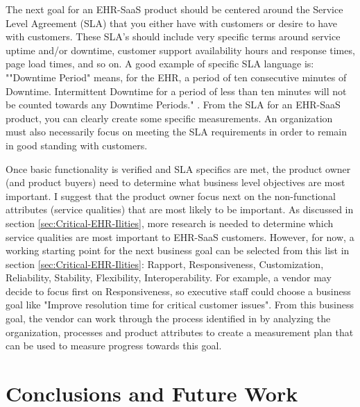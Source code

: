 \documentclass[10pt]{article}
\begin{document}
The next goal for an EHR-SaaS product should be centered around the Service Level Agreement (SLA) that you either have with customers or desire to have with customers.
These SLA's should include very specific terms around service uptime and/or downtime, customer support availability hours and response times, page load times, and so on.
A good example of specific SLA language is: ""Downtime Period" means, for the EHR, a period of ten consecutive minutes of Downtime. Intermittent Downtime for a period of less than ten minutes will not be counted towards any Downtime Periods." \cite{emr-sla-example}. 
From the SLA for an EHR-SaaS product, you can clearly create some specific measurements.
An organization must also necessarily focus on meeting the SLA requirements in order to remain in good standing with customers.

Once basic functionality is verified and SLA specifics are met, the product owner (and product buyers) need to determine what business level objectives are most important.
I suggest that the product owner focus next on the non-functional attributes (service qualities) that are most likely to be important.
As discussed in section \ref{sec:Critical-EHR-Ilities}, more research is needed to determine which service qualities are most important to EHR-SaaS customers.
However, for now, a working starting point for the next business goal can be selected from this list in section \ref{sec:Critical-EHR-Ilities}: Rapport, Responsiveness, Customization, Reliability, Stability, Flexibility, Interoperability.
For example, a vendor may decide to focus first on Responsiveness, so executive staff could choose a business goal like "Improve resolution time for critical customer issues".
From this business goal, the vendor can work through the process identified in \cite{sei-gqim} by analyzing the organization, processes and product attributes to create a measurement plan that can be used to measure progress towards this goal.

\section{Conclusions and Future Work}
\end{document}
